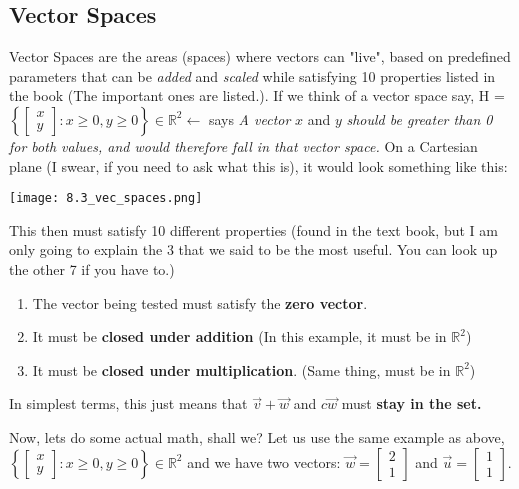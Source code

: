 \subsection{Vector Spaces}
Vector Spaces are the areas (spaces) where vectors can "live", based on predefined parameters that can be \textit{added} and \textit{scaled} while satisfying 10 properties listed in the book (The important ones are listed.). If we think of a vector space say, H = \( \left\{ \begin{bmatrix} x \\ y \end{bmatrix}  : x \geq 0, y \geq 0 \right\} \in \mathbb{R}^2 \gets\) says \textit{A vector} \(x\) and \(y\) \textit{should be greater than 0 for both values, and would therefore fall in that vector space.} On a Cartesian plane (I swear, if you need to ask what this is), it would look something like this:
\begin{center} \texttt{[image: 8.3\_vec\_spaces.png]} \end{center}
This then must satisfy 10 different properties (found in the text book, but I am only going to explain the 3 that we said to be the most useful. You can look up the other 7 if you have to.)
\begin{enumerate}
    \item The vector being tested must satisfy the \textbf{zero vector}.
    \item It must be \textbf{closed under addition} (In this example, it must be in \(\mathbb{R}^2\))
    \item It must be \textbf{closed under multiplication}. (Same thing, must be in \(\mathbb{R}^2\))
\end{enumerate}

\begin{tcolorbox}[mybox]
    In simplest terms, this just means that \(\vec{v} + \vec{w}\) and \(c\vec{w}\) must \textbf{stay in the set.}
\end{tcolorbox}

Now, lets do some actual math, shall we? Let us use the same example as above, \( \left\{ \begin{bmatrix} x \\ y \end{bmatrix}  : x \geq 0, y \geq 0 \right\} \in \mathbb{R}^2 \) and we have two vectors: \(\vec{w} = \begin{bmatrix} 2 \\ 1 \end{bmatrix}\) and \(\vec{u} = \begin{bmatrix} 1 \\ 1 \end{bmatrix}\).




